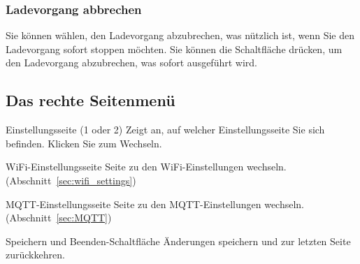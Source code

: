 \subsubsection{Ladevorgang abbrechen}

Sie können wählen, den Ladevorgang abzubrechen, was nützlich ist, wenn Sie den Ladevorgang sofort stoppen möchten.
Sie können die Schaltfläche drücken, um den Ladevorgang abzubrechen, was sofort ausgeführt wird.\\

\clearpage

\subsection{Das rechte Seitenmenü}

{Einstellungsseite (1 oder 2)}
{Zeigt an, auf welcher Einstellungsseite Sie sich befinden. Klicken Sie zum Wechseln.}

{WiFi-Einstellungsseite}
{Seite zu den WiFi-Einstellungen wechseln. (Abschnitt~\ref{sec:wifi_settings})}

{MQTT-Einstellungsseite}
{Seite zu den MQTT-Einstellungen wechseln. (Abschnitt~\ref{sec:MQTT})}

{Speichern und Beenden-Schaltfläche}
{Änderungen speichern und zur letzten Seite zurückkehren.}
